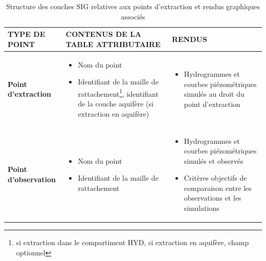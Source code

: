 \begin{table}[H]
    \begin{tabular}{|C{0.2\textwidth}|C{0.35\textwidth}|C{0.35\textwidth}|}
        \hline
        \textbf{TYPE DE POINT}& \textbf{CONTENUS DE LA TABLE ATTRIBUTAIRE} & \textbf{RENDUS} \tabularnewline                    \hline
        \textbf{Point d’extraction}  & 
        \begin{itemize}[leftmargin=*, itemsep=0.5ex]
            \item Nom du point
            \item Identifiant de la maille de rattachement\footnote{ si extraction dans le compartiment HYD,  si extraction en aquifère, champ optionnel}, identifiant de la couche aquifère (si extraction en aquifère)\end{itemize} & \begin{itemize}[leftmargin=*, itemsep=0.5ex]\item Hydrogrammes et courbes piézométriques simulés au droit du point d’extraction\end{itemize} \tabularnewline                     \hline
        \textbf{Point d’observation} & 
        \begin{itemize}[leftmargin=*, itemsep=0.5ex]
            \item Nom du point
            \item Identifiant de la maille de rattachement \footnotemark[\value{footnote}]
        \end{itemize} & 
        \begin{itemize}[leftmargin=*, itemsep=0.5ex]
            \item Hydrogrammes et courbes piézométriques simulés et observés
            \item Critères objectifs de comparaison entre les observations et les simulations
        \end{itemize} \tabularnewline \hline
    \end{tabular}
    \label{tab_obs_extract}
    \caption{Structure des couches SIG relatives aux points d’extraction et rendus graphiques associés}
\end{table}

\vspace{8pt}


